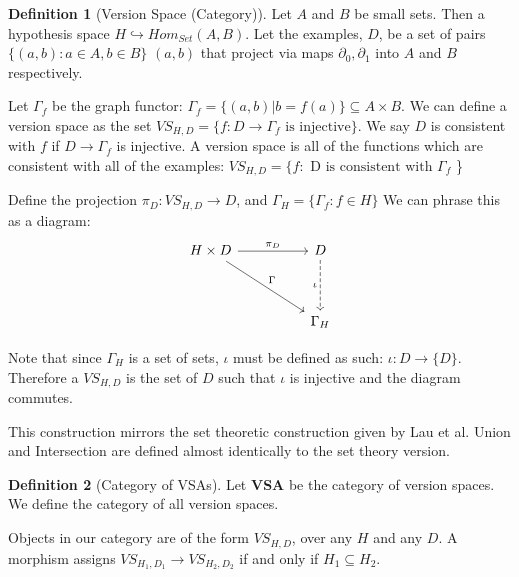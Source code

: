 \documentclass{article}
\theoremstyle{definition}
\newtheorem{definition}{Definition}[section]
\begin{document}
\begin{definition}[Version Space (Category)]
Let $A$ and $B$ be small sets. Then a hypothesis space $H \hookrightarrow Hom_{Set}(A, B)$. Let the examples, $D$, be a set of pairs $\{(a,b) : a \in A, b \in B\}$ $(a,b)$ that project via maps $\partial_0, \partial_1$ into $A$ and $B$ respectively.

Let $\Gamma_f$ be the graph functor: $\Gamma_f = \{(a,b) | b = f(a)\} \subseteq A\times B$. We can define a version space as the set  $VS_{H,D} = \{f : D \rightarrow \Gamma_f \text{ is injective}\}$. We say $D$ is consistent with $f$ if $D \rightarrow \Gamma_f$ is injective. A version space is all of the functions which are consistent with all of the examples: $VS_{H, D} = \{f : \text{ D is consistent with } \Gamma_f $ \}

Define the projection $\pi_D : VS_{H,D} \rightarrow D$, and $\Gamma_H = \{\Gamma_f : f \in H\}$
We can phrase this as a diagram: 
\[\begin{tikzcd}
	{H\times D} && D \\
	\\
	&& {\Gamma_H}
	\arrow["\Gamma", from=1-1, to=3-3]
	\arrow["{\pi_{D}}", from=1-1, to=1-3]
	\arrow["\iota"', dashed, from=1-3, to=3-3]
\end{tikzcd}\]

Note that since $\Gamma_H$ is a set of sets, $\iota$ must be defined as such: $\iota: D\rightarrow \{D\}$. Therefore a $VS_{H,D}$ is the set of $D$ such that $\iota$ is injective and the diagram commutes.

\end{definition}

This construction mirrors the set theoretic construction given by Lau et al. \cite{short} Union and Intersection are defined almost identically to the set theory version. 


\begin{definition}[Category of VSAs]
Let \textbf{VSA} be the category of version spaces. We define the category of all version spaces. 

Objects in our category are of the form $VS_{H,D}$, over any $H$ and any $D$. A morphism assigns $VS_{H_1, D_1} \rightarrow VS_{H_2, D_2}$ if and only if $H_1 \subseteq H_2$.
\end{definition}
\end{document}
